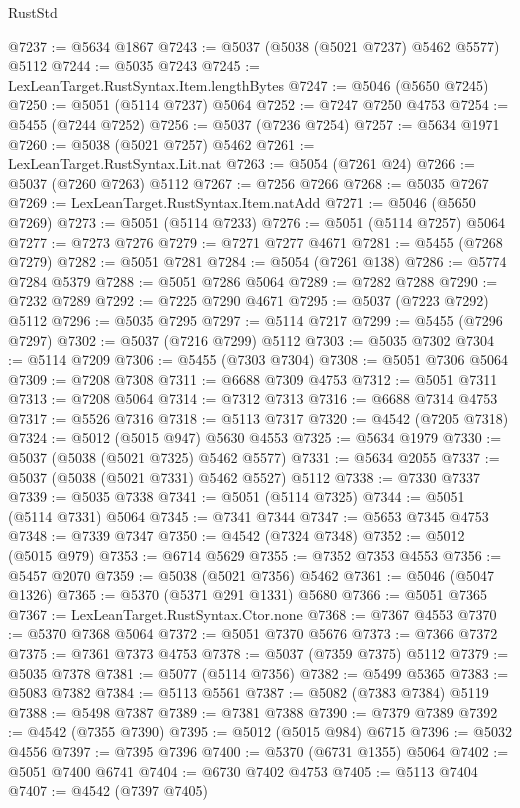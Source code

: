 \begin{lexlean}{RustStd}
\begin{coremodule}
@7237 := @5634 @1867
@7243 := @5037 (@5038 (@5021 @7237) @5462 @5577) @5112
@7244 := @5035 @7243
@7245 := LexLeanTarget.RustSyntax.Item.lengthBytes
@7247 := @5046 (@5650 @7245)
@7250 := @5051 (@5114 @7237) @5064
@7252 := @7247 @7250 @4753
@7254 := @5455 (@7244 @7252)
@7256 := @5037 (@7236 @7254)
@7257 := @5634 @1971
@7260 := @5038 (@5021 @7257) @5462
@7261 := LexLeanTarget.RustSyntax.Lit.nat
@7263 := @5054 (@7261 @24)
@7266 := @5037 (@7260 @7263) @5112
@7267 := @7256 @7266
@7268 := @5035 @7267
@7269 := LexLeanTarget.RustSyntax.Item.natAdd
@7271 := @5046 (@5650 @7269)
@7273 := @5051 (@5114 @7233)
@7276 := @5051 (@5114 @7257) @5064
@7277 := @7273 @7276
@7279 := @7271 @7277 @4671
@7281 := @5455 (@7268 @7279)
@7282 := @5051 @7281
@7284 := @5054 (@7261 @138)
@7286 := @5774 @7284 @5379
@7288 := @5051 @7286 @5064
@7289 := @7282 @7288
@7290 := @7232 @7289
@7292 := @7225 @7290 @4671
@7295 := @5037 (@7223 @7292) @5112
@7296 := @5035 @7295
@7297 := @5114 @7217
@7299 := @5455 (@7296 @7297)
@7302 := @5037 (@7216 @7299) @5112
@7303 := @5035 @7302
@7304 := @5114 @7209
@7306 := @5455 (@7303 @7304)
@7308 := @5051 @7306 @5064
@7309 := @7208 @7308
@7311 := @6688 @7309 @4753
@7312 := @5051 @7311
@7313 := @7208 @5064
@7314 := @7312 @7313
@7316 := @6688 @7314 @4753
@7317 := @5526 @7316
@7318 := @5113 @7317
@7320 := @4542 (@7205 @7318)
@7324 := @5012 (@5015 @947) @5630 @4553
@7325 := @5634 @1979
@7330 := @5037 (@5038 (@5021 @7325) @5462 @5577)
@7331 := @5634 @2055
@7337 := @5037 (@5038 (@5021 @7331) @5462 @5527) @5112
@7338 := @7330 @7337
@7339 := @5035 @7338
@7341 := @5051 (@5114 @7325)
@7344 := @5051 (@5114 @7331) @5064
@7345 := @7341 @7344
@7347 := @5653 @7345 @4753
@7348 := @7339 @7347
@7350 := @4542 (@7324 @7348)
@7352 := @5012 (@5015 @979)
@7353 := @6714 @5629
@7355 := @7352 @7353 @4553
@7356 := @5457 @2070
@7359 := @5038 (@5021 @7356) @5462
@7361 := @5046 (@5047 @1326)
@7365 := @5370 (@5371 @291 @1331) @5680
@7366 := @5051 @7365
@7367 := LexLeanTarget.RustSyntax.Ctor.none
@7368 := @7367 @4553
@7370 := @5370 @7368 @5064
@7372 := @5051 @7370 @5676
@7373 := @7366 @7372
@7375 := @7361 @7373 @4753
@7378 := @5037 (@7359 @7375) @5112
@7379 := @5035 @7378
@7381 := @5077 (@5114 @7356)
@7382 := @5499 @5365
@7383 := @5083 @7382
@7384 := @5113 @5561
@7387 := @5082 (@7383 @7384) @5119
@7388 := @5498 @7387
@7389 := @7381 @7388
@7390 := @7379 @7389
@7392 := @4542 (@7355 @7390)
@7395 := @5012 (@5015 @984) @6715
@7396 := @5032 @4556
@7397 := @7395 @7396
@7400 := @5370 (@6731 @1355) @5064
@7402 := @5051 @7400 @6741
@7404 := @6730 @7402 @4753
@7405 := @5113 @7404
@7407 := @4542 (@7397 @7405)

\end{coremodule}
\end{lexlean}
